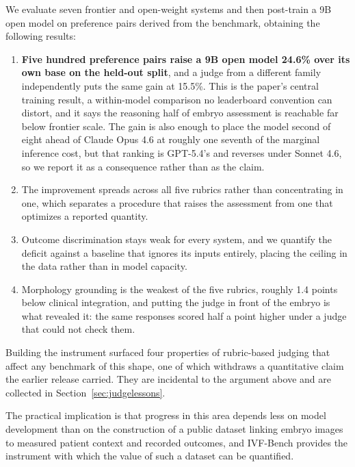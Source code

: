 \documentclass[11pt]{article}
\begin{document}
We evaluate seven frontier and open-weight systems and then post-train a 9B open
model on preference pairs derived from the benchmark, obtaining the following results:

\begin{enumerate}
\item \textbf{Five hundred preference pairs raise a 9B open model 24.6\% over its
      own base on the held-out split}, and a judge from a different family
      independently puts the same gain at 15.5\%. This is the paper's central
      training result, a within-model comparison no leaderboard convention can
      distort, and it says the reasoning half of embryo assessment is reachable
      far below frontier scale. The gain is also enough to place the model second
      of eight ahead of Claude Opus 4.6 at roughly one seventh of the marginal
      inference cost, but that ranking is GPT-5.4's and reverses under Sonnet 4.6,
      so we report it as a consequence rather than as the claim.
\item The improvement spreads across all five rubrics rather than concentrating
      in one, which separates a procedure that raises the assessment from one
      that optimizes a reported quantity.
\item Outcome discrimination stays weak for every system, and we quantify the
      deficit against a baseline that ignores its inputs entirely, placing the
      ceiling in the data rather than in model capacity.
\item Morphology grounding is the weakest of the five rubrics, roughly 1.4 points
      below clinical integration, and putting the judge in front of the embryo is
      what revealed it: the same responses scored half a point higher under a
      judge that could not check them.
\end{enumerate}

Building the instrument surfaced four properties of rubric-based judging that
affect any benchmark of this shape, one of which withdraws a quantitative claim
the earlier release carried. They are incidental to the argument above and are
collected in Section~\ref{sec:judgelessons}.

The practical implication is that progress in this area depends less on model
development than on the construction of a public dataset linking embryo images to
measured patient context and recorded outcomes, and IVF-Bench provides the
instrument with which the value of such a dataset can be quantified.

\end{document}
